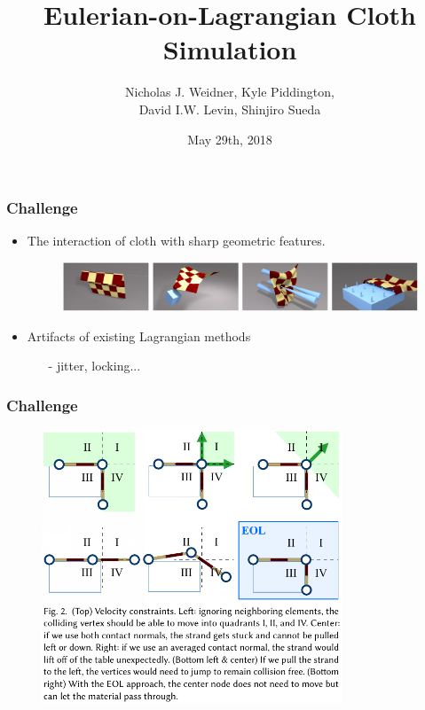 \documentclass[serif,mathserif, 12pt]{beamer}
\title[\hspace{2em}\insertframenumber/\inserttotalframenumber]{Eulerian-on-Lagrangian Cloth Simulation}
\date{May 29th, 2018}
\author{Nicholas J. Weidner, Kyle Piddington, \\
  David I.W. Levin, Shinjiro Sueda}
\begin{document}
\maketitle

\begin{frame}
  \frametitle{Challenge}
  \begin{itemize}
  \item The interaction of cloth with sharp geometric features.
    \begin{figure}
      \centering
      \includegraphics[width=\textwidth]{img/teaser}
    \end{figure}
    \pause
  \item Artifacts of existing Lagrangian methods
    \begin{itemize}
    \item[-] jitter, locking...
    \end{itemize}
  \end{itemize}
\end{frame}

\begin{frame}
  \frametitle{Challenge}
  \begin{figure}
    \centering
    \includegraphics[width=0.8\textwidth]{img/strand}
  \end{figure}
\end{frame}
\end{document}
